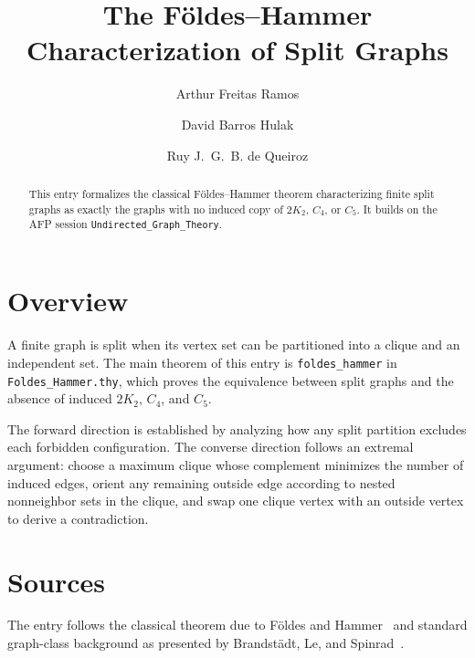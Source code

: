 \documentclass[11pt,a4paper]{article}
\begin{document}
\title{The F{\"o}ldes--Hammer Characterization of Split Graphs}
\author{Arthur Freitas Ramos \and David Barros Hulak \and Ruy J.~G.~B. de Queiroz}
\maketitle

\begin{abstract}
This entry formalizes the classical F{\"o}ldes--Hammer theorem characterizing
finite split graphs as exactly the graphs with no induced copy of $2K_2$, $C_4$,
or $C_5$.  It builds on the AFP session \texttt{Undirected\_Graph\_Theory}.

\end{abstract}

\section{Overview}

A finite graph is split when its vertex set can be partitioned into a clique and
an independent set. The main theorem of this entry is
\texttt{foldes\_hammer} in \texttt{Foldes\_Hammer.thy}, which proves the
equivalence between split graphs and the absence of induced $2K_2$, $C_4$, and
$C_5$.

The forward direction is established by analyzing how any split partition
excludes each forbidden configuration. The converse direction follows an
extremal argument: choose a maximum clique whose complement minimizes the number
of induced edges, orient any remaining outside edge according to nested
nonneighbor sets in the clique, and swap one clique vertex with an outside
vertex to derive a contradiction.

\section{Sources}

The entry follows the classical theorem due to F{\"o}ldes and
Hammer~\cite{FoldesHammer1977} and standard graph-class background as presented
by Brandst{\"a}dt, Le, and Spinrad~\cite{Brandstadt1999}.

\tableofcontents

\sloppy

\fussy



\end{document}
